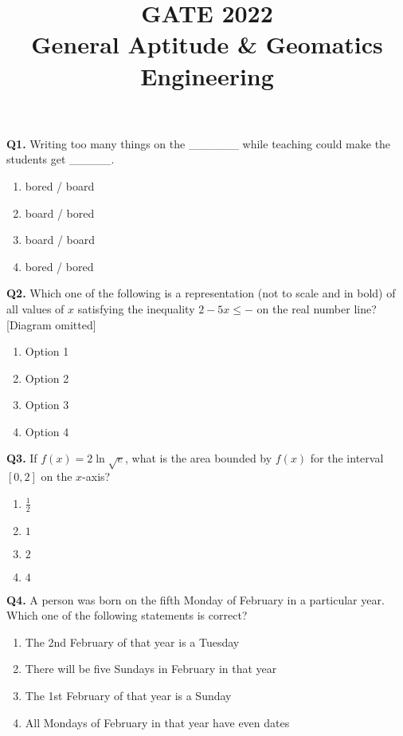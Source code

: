 \documentclass[12pt,a4paper]{article}
\begin{document}
\title{GATE 2022 \\ General Aptitude \& Geomatics Engineering}
\author{}
\date{}
\maketitle

\textbf{Q1.} Writing too many things on the \_\_\_\_\_\_ while teaching could make the students get \_\_\_\_\_.  
\begin{enumerate}
    \item bored / board
    \item board / bored
    \item board / board
    \item bored / bored
\end{enumerate}

\textbf{Q2.} Which one of the following is a representation (not to scale and in bold) of all values of $x$ satisfying the inequality $2 - 5x \le -$ on the real number line? [Diagram omitted]  
\begin{enumerate}
    \item Option 1
    \item Option 2
    \item Option 3
    \item Option 4
\end{enumerate}

\textbf{Q3.} If $f(x) = 2 \ln \sqrt{e}$, what is the area bounded by $f(x)$ for the interval $[0, 2]$ on the $x$-axis?  
\begin{enumerate}
    \item $\frac{1}{2}$
    \item $1$
    \item $2$
    \item $4$
\end{enumerate}

\textbf{Q4.} A person was born on the fifth Monday of February in a particular year. Which one of the following statements is correct?  
\begin{enumerate}
    \item The 2nd February of that year is a Tuesday
    \item There will be five Sundays in February in that year
    \item The 1st February of that year is a Sunday
    \item All Mondays of February in that year have even dates
\end{enumerate}
\end{document}
